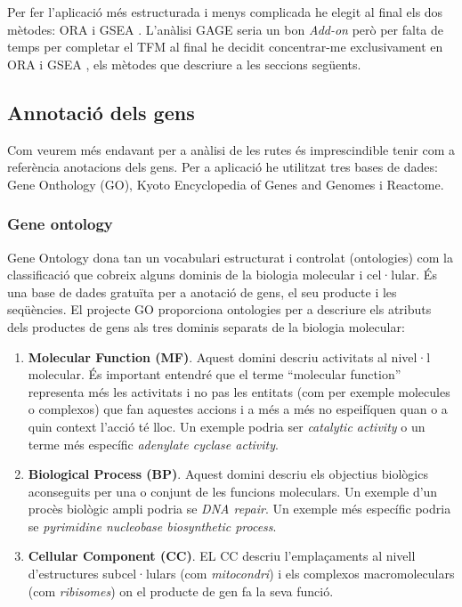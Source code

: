 \documentclass[]{article}
\begin{document}
Per fer l'aplicació més estructurada i menys complicada he elegit al final els dos mètodes: ORA \cite{boyle2004go} i GSEA \cite{subramanian2005gene}. L'anàlisi GAGE seria un bon \textit{Add-on} però per falta de temps per completar el TFM al final he decidit concentrar-me exclusivament en ORA i GSEA , els mètodes que descriure a les seccions següents.

\subsection{Annotació dels gens}

Com veurem més endavant per a anàlisi de les rutes és imprescindible tenir com a referència anotacions dels gens. Per a aplicació he utilitzat tres bases de dades: Gene Onthology (GO), Kyoto Encyclopedia of Genes and Genomes i Reactome. 

\subsubsection{Gene ontology}
Gene Ontology \cite{gene2004gene} dona tan un vocabulari estructurat i controlat (ontologies) com la classificació que cobreix alguns dominis de la biologia molecular i cel·lular. És una base de dades gratuïta per a anotació de gens, el seu producte i les seqüències. El projecte GO proporciona ontologies per a descriure els atributs dels productes de gens als tres dominis separats de la biologia molecular:
\begin{enumerate}
\item \textbf{Molecular Function (MF)}. Aquest domini descriu activitats al nivel·l molecular. És important entendré que el terme ``molecular function'' representa més les activitats i no pas les entitats (com per exemple molecules o complexos) que fan aquestes accions i a més a més no espeifíquen quan o a quin context l'acció té lloc. Un exemple podria ser \textit{catalytic activity} o un terme més específic \textit{adenylate cyclase activity}.
\item \textbf{Biological Process (BP)}. Aquest domini descriu els objectius biològics aconseguits per una o conjunt de les funcions moleculars. Un exemple d'un procès biològic ampli podria se \textit{DNA repair}. Un exemple més específic podria se \textit{pyrimidine nucleobase biosynthetic process}. 
\item \textbf{Cellular Component (CC)}. EL CC descriu l'emplaçaments al nivell d'estructures subcel·lulars (com \textit{mitocondri}) i els complexos macromoleculars (com \textit{ribisomes}) on el producte de gen fa la seva funció.
\end{enumerate}
\end{document}
